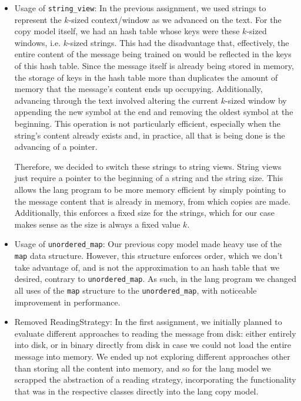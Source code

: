 \documentclass{article}
\begin{document}
\begin{itemize}
    \item Usage of \verb|string_view|:
    In the previous assignment, we used strings to represent the $k$-sized context/window as we advanced on the text.
    For the copy model itself, we had an hash table whose keys were these $k$-sized windows, i.e. $k$-sized strings.
    This had the disadvantage that, effectively, the entire content of the message being trained on would be reflected in the keys of this hash table.
    Since the message itself is already being stored in memory, the storage of keys in the hash table more than duplicates the amount of memory that the message's content ends up occupying.
    Additionally, advancing through the text involved altering the current $k$-sized window by appending the new symbol at the end and removing the oldest symbol at the beginning.
    This operation is not particularly efficient, especially when the string's content already exists and, in practice, all that is being done is the advancing of a pointer.

    Therefore, we decided to switch these strings to string views.
    String views just require a pointer to the beginning of a string and the string size.
    This allows the lang program to be more memory efficient by simply pointing to the message content that is already in memory, from which copies are made.
    Additionally, this enforces a fixed size for the strings, which for our case makes sense as the size is always a fixed value $k$.
    
    \item Usage of \verb|unordered_map|:
    Our previous copy model made heavy use of the \verb|map| data structure.
    However, this structure enforces order, which we don't take advantage of, and is not the approximation to an hash table that we desired, contrary to \verb|unordered_map|.
    As such, in the lang program we changed all uses of the \verb|map| structure to the \verb|unordered_map|, with noticeable improvement in performance.
    
    \item Removed ReadingStrategy:
    In the first assignment, we initially planned to evaluate different approaches to reading the message from disk: either entirely into disk, or in binary directly from disk in case we could not load the entire message into memory.
    We ended up not exploring different approaches other than storing all the content into memory, and so for the lang model we scrapped the abstraction of a reading strategy, incorporating the functionality that was in the respective classes directly into the lang copy model.
\end{itemize}
\end{document}
